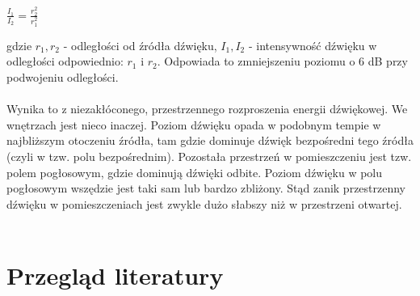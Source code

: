 \documentclass[a4paper, 12pt]{article}
\begin{document}
\begin{center}
$\frac{I_{1}}{I_{2}} = \frac{r_{2}^{2}}{r_{1}^{2}}$
\end{center}

gdzie $r_{1}, r_{2}$ - odległości od źródła dźwięku, $I_{1}, I_{2}$ - intensywność dźwięku w odległości odpowiednio: $r_{1}$ i $r_{2}$. Odpowiada to zmniejszeniu poziomu o 6 dB przy podwojeniu odległości. 
\\ \\
Wynika to z niezakłóconego, przestrzennego rozproszenia energii dźwiękowej. We wnętrzach jest nieco inaczej. Poziom dźwięku opada w podobnym tempie w najbliższym otoczeniu źródła, tam gdzie dominuje dźwięk bezpośredni tego źródła (czyli w tzw. polu bezpośrednim). Pozostała przestrzeń w pomieszczeniu jest tzw. polem pogłosowym, gdzie dominują dźwięki odbite. Poziom dźwięku w polu pogłosowym wszędzie jest taki sam lub bardzo zbliżony. Stąd zanik przestrzenny dźwięku w pomieszczeniach jest zwykle dużo słabszy niż w przestrzeni otwartej.
\\ \\

\section{Przegląd literatury}
\end{document}

